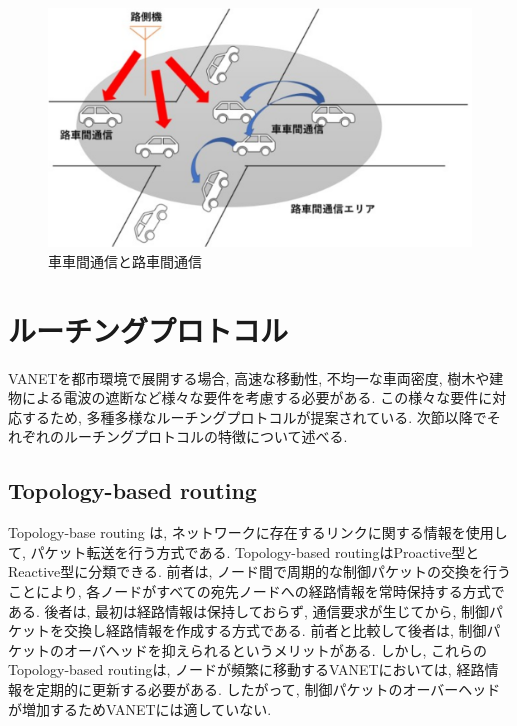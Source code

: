 \documentclass[10pt]{jreport}
\begin{document}
\begin{figure}[!ht]
\centering
\includegraphics[width=15cm]{figures/VANET.eps}
\caption{車車間通信と路車間通信}
\label{fig:VANET}
\end{figure}


\section{ルーチングプロトコル}
\label{RoutingProtocol}
VANETを都市環境で展開する場合, 高速な移動性, 不均一な車両密度, 樹木や建物による電波の遮断など様々な要件を考慮する必要がある. この様々な要件に対応するため, 多種多様なルーチングプロトコルが提案されている\cite{2}. 次節以降でそれぞれのルーチングプロトコルの特徴について述べる.

\subsection{Topology-based routing}
\label{Topology}
Topology-base routing\cite {3,4,5} は, ネットワークに存在するリンクに関する情報を使用して, パケット転送を行う方式である. Topology-based routingはProactive型とReactive型に分類できる. 前者は, ノード間で周期的な制御パケットの交換を行うことにより, 各ノードがすべての宛先ノードへの経路情報を常時保持する方式である. 後者は, 最初は経路情報は保持しておらず, 通信要求が生じてから, 制御パケットを交換し経路情報を作成する方式である. 前者と比較して後者は, 制御パケットのオーバヘッドを抑えられるというメリットがある. 
しかし, これらのTopology-based routingは, ノードが頻繁に移動するVANETにおいては, 経路情報を定期的に更新する必要がある.
したがって, 制御パケットのオーバーヘッドが増加するためVANETには適していない.
\end{document}
